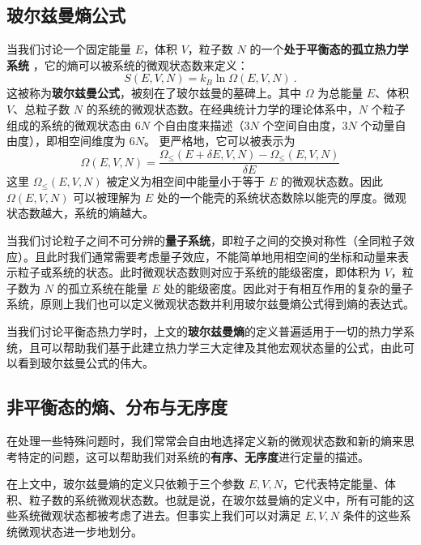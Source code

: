 

\subsection{玻尔兹曼熵公式} 
当我们讨论一个固定能量 $E$，体积 $V$，粒子数 $N$ 的一个\textbf{处于平衡态的孤立热力学系统} ，它的熵可以被系统的微观状态数来定义：
\begin{equation}
S(E,V,N) = k_B \ln \Omega(E,V,N)~.
\end{equation}
这被称为\textbf{玻尔兹曼公式}，被刻在了玻尔兹曼的墓碑上。其中 $\Omega$ 为总能量 $E$、体积 $V$、总粒子数 $N$ 的系统的微观状态数。在经典统计力学的理论体系中，$N$ 个粒子组成的系统的微观状态由 $6N$ 个自由度来描述（$3N$ 个空间自由度，$3N$ 个动量自由度），即相空间维度为 $6N$。
更严格地，它可以被表示为
\begin{equation}\label{eq_entro2_1}
\Omega(E,V,N)=\frac{\Omega_{\le}(E+\delta E,V,N)-\Omega_{\le}(E,V,N)}{\delta E}
\end{equation}
这里 $\Omega_{\le}(E,V,N)$ 被定义为相空间中能量小于等于 $E$ 的微观状态数。因此 $\Omega(E,V,N)$ 可以被理解为 $E$ 处的一个能壳的系统状态数除以能壳的厚度。微观状态数越大，系统的熵越大。

当我们讨论粒子之间不可分辨的\textbf{量子系统}，即粒子之间的交换对称性（全同粒子效应）。且此时我们通常需要考虑量子效应，不能简单地用相空间的坐标和动量来表示粒子或系统的状态。此时微观状态数则对应于系统的能级密度，即体积为 $V$，粒子数为 $N$ 的孤立系统在能量 $E$ 处的能级密度。因此对于有相互作用的复杂的量子系统，原则上我们也可以定义微观状态数并利用玻尔兹曼熵公式得到熵的表达式。

当我们讨论平衡态热力学时，上文的\textbf{玻尔兹曼熵}的定义普遍适用于一切的热力学系统，且可以帮助我们基于此建立热力学三大定律及其他宏观状态量的公式，由此可以看到玻尔兹曼公式的伟大。
\subsection{非平衡态的熵、分布与无序度}
在处理一些特殊问题时，我们常常会自由地选择定义新的微观状态数和新的熵来思考特定的问题，这可以帮助我们对系统的\textbf{有序、无序度}进行定量的描述。

在上文中，玻尔兹曼熵的定义只依赖于三个参数 $E,V,N$，它代表特定能量、体积、粒子数的系统微观状态数。也就是说，在玻尔兹曼熵的定义中，所有可能的这些系统微观状态都被考虑了进去。但事实上我们可以对满足 $E,V,N$ 条件的这些系统微观状态进一步地划分。

